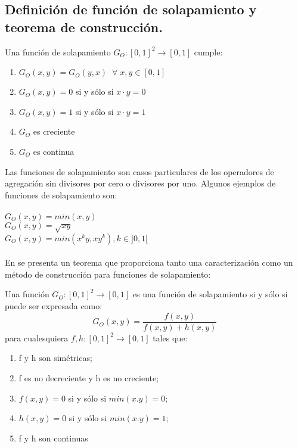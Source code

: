 \subsection{Definición de función de solapamiento y teorema de construcción.}
\begin{definition}
Una función de solapamiento $G_{O} : [0,1]^{2} \rightarrow [0,1]$ cumple:
\begin{enumerate}[label=(G\arabic*),ref=(G\arabic*)]
   \item $G_{O}(x,y) = G_{O}(y,x) \;\; \forall \; x,y \in [0,1]$ \label{G1}
   \item $G_{O}(x,y) = 0$ si y sólo si $x \cdot y = 0$ \label{G2}
   \item $G_{O}(x,y) = 1$ si y sólo si $x \cdot y = 1$ \label{G3}
   \item $G_{O}$ es creciente \label{G4}
   \item $G_{O}$ es continua \label{G5}
\end{enumerate}
\end{definition}
Las funciones de solapamiento son casos particulares de los operadores de agregación sin divisores por cero o divisores por uno. Algunos ejemplos de funciones de solapamiento son:\\
\\
$G_{O}(x,y) = min(x,y)$\\
$G_{O}(x,y) = \sqrt{xy}$\\
$G_{O}(x,y) = min(x^{k}y,xy^{k}), k \in ]0,1[$\\
\\
En \cite{bustince2009overlap} se presenta un teorema que proporciona tanto una caracterización como un método de construcción para funciones de solapamiento:
\begin{theorem}\label{th:overlap-function-construction}
Una función $G_{O} : [0,1]^{2} \rightarrow [0,1]$ es una función de solapamiento si y sólo si puede ser expresada como:
\begin{equation}
G_{O}(x,y) = \frac{f(x,y)}{f(x,y) + h(x,y)}
\end{equation}
para cualesquiera $f,h: [0,1]^{2} \rightarrow [0,1]$ tales que:
\begin{enumerate}[label=(\arabic*),ref=(\arabic*)]
   \item f y h son simétricas;
   \item f es no decreciente y h es no creciente;
   \item $f(x,y) = 0$ si y sólo si $min(x.y) = 0$;
   \item $h(x,y) = 0$ si y sólo si $min(x.y) = 1$;
   \item f y h son continuas
\end{enumerate}
\end{theorem}
